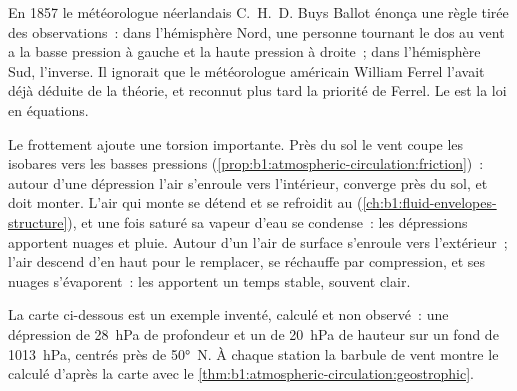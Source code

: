 \begin{history}
En 1857 le météorologue néerlandais C.~H.~D. Buys Ballot énonça une règle tirée des
observations~: dans l'hémisphère Nord, une personne tournant le dos au
vent a la basse pression à gauche et la haute pression à droite~; dans l'hémisphère
Sud, l'inverse. Il ignorait que le météorologue américain William
Ferrel l'avait déjà déduite de la théorie, et reconnut plus tard la priorité de Ferrel.
Le  est la loi en équations.
\end{history}

Le frottement ajoute une torsion importante. Près du sol le vent coupe les isobares
vers les basses pressions (\cref{prop:b1:atmospheric-circulation:friction})~: autour d'une
dépression l'air s'enroule vers l'intérieur, converge près du sol, et doit monter. L'air
qui monte se détend et se refroidit au 
(\cref{ch:b1:fluid-envelopes-structure}), et une fois saturé sa vapeur d'eau
se condense~: les dépressions apportent nuages et pluie. Autour d'un  l'air de surface
s'enroule vers l'extérieur~; l'air descend d'en haut pour le remplacer, se réchauffe par compression, et
ses nuages s'évaporent~: les  apportent un temps stable, souvent clair.

La carte ci-dessous est un exemple inventé, calculé et non observé~: une dépression
de \qty{28}{hPa} de profondeur et un  de \qty{20}{hPa} de hauteur sur un fond de
\qty{1013}{hPa}, centrés près de \ang{50}~N. À chaque station la barbule de vent montre le
 calculé d'après la carte avec le \cref{thm:b1:atmospheric-circulation:geostrophic}.

